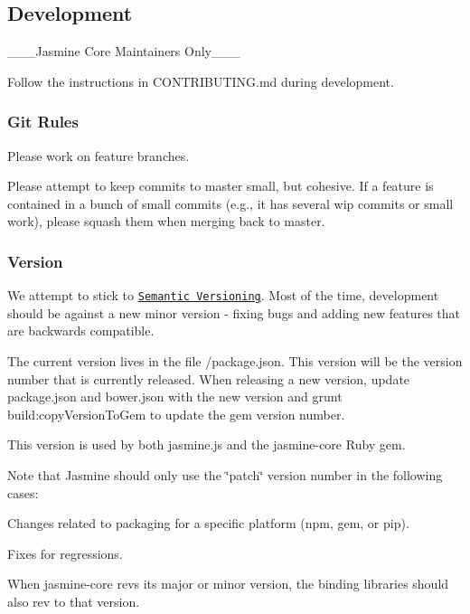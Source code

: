 \subsection*{Development}

\+\_\+\+\_\+\+\_\+\+Jasmine Core Maintainers Only\+\_\+\+\_\+\+\_\+

Follow the instructions in {\ttfamily C\+O\+N\+T\+R\+I\+B\+U\+T\+I\+N\+G.\+md} during development.

\subsubsection*{Git Rules}

Please work on feature branches.

Please attempt to keep commits to {\ttfamily master} small, but cohesive. If a feature is contained in a bunch of small commits (e.\+g., it has several wip commits or small work), please squash them when merging back to {\ttfamily master}.

\subsubsection*{Version}

We attempt to stick to \href{http://semver.org/}{\tt Semantic Versioning}. Most of the time, development should be against a new minor version -\/ fixing bugs and adding new features that are backwards compatible.

The current version lives in the file {\ttfamily /package.json}. This version will be the version number that is currently released. When releasing a new version, update {\ttfamily package.\+json} and {\ttfamily bower.\+json} with the new version and {\ttfamily grunt build\+:copy\+Version\+To\+Gem} to update the gem version number.

This version is used by both {\ttfamily jasmine.\+js} and the {\ttfamily jasmine-\/core} Ruby gem.

Note that Jasmine should only use the \char`\"{}patch\char`\"{} version number in the following cases\+:


\begin{DoxyItemize}
\item Changes related to packaging for a specific platform (npm, gem, or pip).
\item Fixes for regressions.
\end{DoxyItemize}

When jasmine-\/core revs its major or minor version, the binding libraries should also rev to that version.

